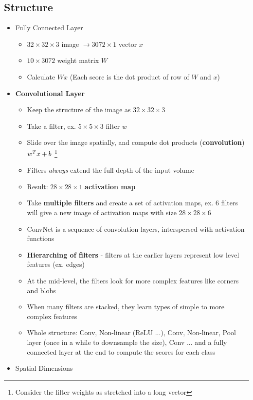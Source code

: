 \subsection{Structure}
\begin{itemize}
	\item Fully Connected Layer
	\begin{itemize}
		\item $32 \times 32\times 3$ image $\rightarrow 3072\times 1$ vector $x$
		\item $10\times 3072$ weight matrix $W$
		\item Calculate $Wx$ (Each score is the dot product of row of $W$ and $x$)
	\end{itemize}
	\item \textbf{Convolutional Layer}
	\begin{itemize}
		\item Keep the structure of the image as $32 \times 32\times 3$
		\item Take a filter, ex. $5\times 5\times 3$ filter $w$
		\item Slide over the image spatially, and compute dot products (\textbf{convolution}) $w^T x + b$ \footnote{Consider the filter weights as stretched into a long vector}
		\item Filters \textit{always} extend the full depth of the input volume
		\item Result: $28 \times 28 \times 1$ \textbf{activation map}
		\item Take \textbf{multiple filters} and create a set of activation maps, ex. $6$ filters will give a new image of activation maps with size $28 \times 28 \times 6$
		\item ConvNet is a sequence of convolution layers, interspersed with activation functions
		\item \textbf{Hierarching of filters} - filters at the earlier layers represent low level features (ex. edges)
		\item At the mid-level, the filters look for more complex features like corners and blobs
		\item When many filters are stacked, they learn types of simple to more complex features
		\item Whole structure: Conv, Non-linear (ReLU ...), Conv, Non-linear, Pool layer (once in a while to downsample the size), Conv ... and a fully connected layer at the end to compute the scores for each class
	\end{itemize}
	\item Spatial Dimensions

\end{itemize}
